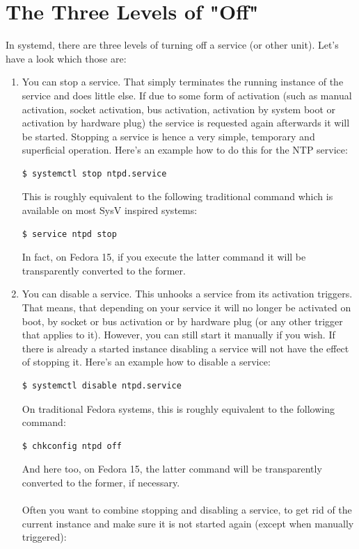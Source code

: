\documentclass[titlepage]{article}
\begin{document}
\section{The Three Levels of "Off"}
In systemd, there are three levels of turning off a service (or other unit). Let's have a look which those are:
\begin{enumerate}
\item
You can stop a service. That simply terminates the running instance of the service and does little else. If due to some form of activation (such as manual activation, socket activation, bus activation, activation by system boot or activation by hardware plug) the service is requested again afterwards it will be started. Stopping a service is hence a very simple, temporary and superficial operation. Here's an example how to do this for the NTP service:
\begin{lstlisting}
$ systemctl stop ntpd.service
\end{lstlisting}
This is roughly equivalent to the following traditional command which is available on most SysV inspired systems:
\begin{lstlisting}
$ service ntpd stop
\end{lstlisting}
In fact, on Fedora 15, if you execute the latter command it will be transparently converted to the former.
\item
You can disable a service. This unhooks a service from its activation triggers. That means, that depending on your service it will no longer be activated on boot, by socket or bus activation or by hardware plug (or any other trigger that applies to it). However, you can still start it manually if you wish. If there is already a started instance disabling a service will not have the effect of stopping it. Here's an example how to disable a service:
\begin{lstlisting}
$ systemctl disable ntpd.service
\end{lstlisting}
On traditional Fedora systems, this is roughly equivalent to the following command:
\begin{lstlisting}
$ chkconfig ntpd off
\end{lstlisting}
And here too, on Fedora 15, the latter command will be transparently converted to the former, if necessary.
\\
\\
Often you want to combine stopping and disabling a service, to get rid of the current instance and make sure it is not started again (except when manually triggered):

\end{enumerate}
\end{document}
